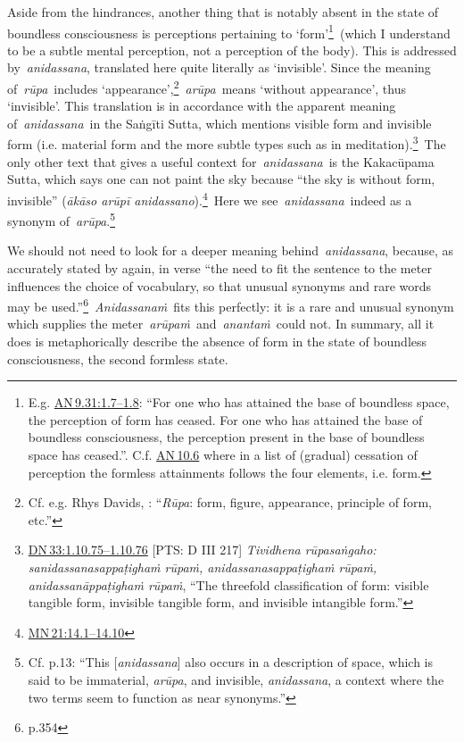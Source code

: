 \documentclass[10pt, openright]{book}
\begin{document}
Aside from the hindrances, another thing that is notably absent in the state of boundless consciousness is perceptions pertaining to ‘form’\footnote {E.g. \href{https://suttacentral.net/an9.31/en/sujato\#1.7}{AN 9.31:1.7–1.8}: “For one who has attained the base of boundless space, the perception of form has ceased. For one who has attained the base of boundless consciousness, the perception present in the base of boundless space has ceased.”. C.f. \href{https://suttacentral.net/an10.6/en/sujato}{AN 10.6} where in a list of (gradual) cessation of perception the formless attainments follows the four elements, i.e. form.} (which I understand to be a subtle mental perception, not a perception of the body). This is addressed by \textit{anidassana}, translated here quite literally as ‘invisible’. Since the meaning of \textit{rūpa} includes ‘appearance’,\footnote {Cf. e.g. Rhys Davids, \cite{PED}: “\textit{Rūpa}: form, figure, appearance, principle of form, etc.”} \textit{arūpa} means ‘without appearance’, thus ‘invisible’. This translation is in accordance with the apparent meaning of \textit{anidassana} in the Saṅgīti Sutta, which mentions visible form and invisible form (i.e. material form and the more subtle types such as in meditation).\footnote {\href{https://suttacentral.net/dn33/en/sujato\#1.10.75}{DN 33:1.10.75–1.10.76} [PTS: D III 217] \textit{Tividhena rūpasaṅgaho: sanidassanasappaṭighaṁ rūpaṁ, anidassanasappaṭighaṁ rūpaṁ, anidassanāppaṭighaṁ rūpaṁ}, “The threefold classification of form: visible tangible form, invisible tangible form, and invisible intangible form.”} The only other text that gives a useful context for \textit{anidassana} is the Kakacūpama Sutta, which says one can not paint the sky because “the sky is without form, invisible” (\textit{ākāso arūpī anidassano}).\footnote {\href{https://suttacentral.net/mn21/en/sujato\#14.1}{MN 21:14.1–14.10}} Here we see \textit{anidassana} indeed as a synonym of \textit{arūpa}.\footnote {Cf. \cite{Anālayo 2017} p.13: “This [\textit{anidassana}] also occurs in a description of space, which is said to be immaterial, \textit{arūpa}, and invisible, \textit{anidassana}, a context where the two terms seem to function as near synonyms.”}


We should not need to look for a deeper meaning behind \textit{anidassana}, because, as accurately stated by \cite{Warder} again, in verse “the need to fit the sentence to the meter influences the choice of vocabulary, so that unusual synonyms and rare words may be used.”\footnote {\cite{Warder} p.354} \textit{Anidassanaṁ} fits this perfectly: it is a rare and unusual synonym which supplies the meter \textit{arūpaṁ} and \textit{anantaṁ} could not. In summary, all it does is metaphorically describe the absence of form in the state of boundless consciousness, the second formless state.
\end{document}
